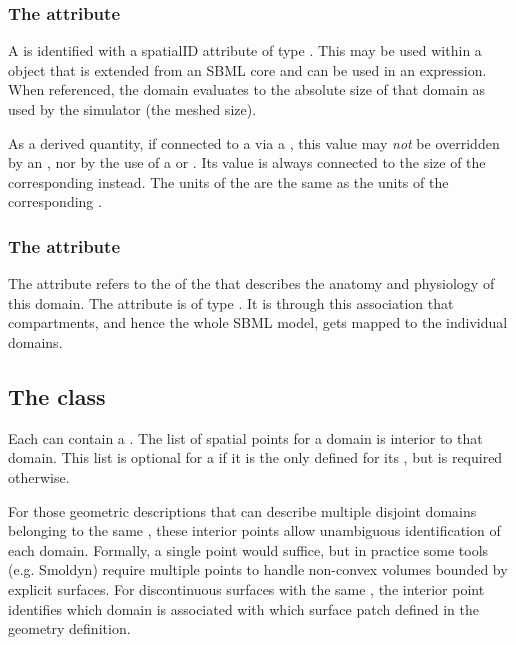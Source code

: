 \subsubsection{The  attribute}
A \Domain is identified with a spatialID attribute of type .  This  may be used within a \SpatialSymbolReference object that is extended from an SBML core \Parameter and can be used in an expression.  When referenced, the domain evaluates to the absolute size of that domain as used by the simulator (the meshed size).

As a derived quantity, if connected to a \Parameter via a \SpatialSymbolReference, this value may \emph{not} be overridden by an \InitialAssignment, nor by the use of a \Rule or \Event.  Its value is always connected to the size of the corresponding \Geometry instead.  The units of the \Domain are the same as the units of the corresponding \DomainType.

\subsubsection{The  attribute}
The  attribute refers to the  of the \DomainType that describes the anatomy and physiology of this domain. The attribute is of type . It is through this association that compartments, and hence the whole SBML model, gets mapped to the individual domains. 


\subsection{The  class}
\label{InteriorPoint-class}
Each \Domain can contain a \ListOfInteriorPoints. The list of spatial points for a domain is interior to that domain.  This list is optional for a \Domain if it is the only \Domain defined for its \DomainType, but is required otherwise.

For those geometric descriptions that can describe multiple disjoint domains belonging to the same , these interior points allow unambiguous identification of each domain.  Formally, a single point would suffice, but in practice some tools (e.g. Smoldyn) require multiple points to handle non-convex volumes bounded by explicit surfaces.  For discontinuous surfaces with the same , the interior point identifies which domain is associated with which surface patch defined in the geometry definition.

